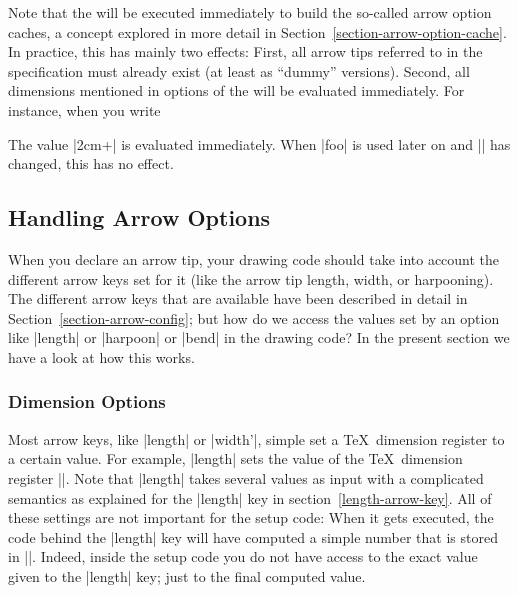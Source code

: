 \begin{command}{\pgfdeclarearrow{}}
\begin{itemize}
            Note that the  will be executed
            immediately to build the so-called arrow option caches, a concept
            explored in more detail in
            Section~\ref{section-arrow-option-cache}. In practice, this has
            mainly two effects: First, all arrow tips referred to in the
            specification must already exist (at least as ``dummy'' versions).
            Second, all dimensions mentioned in options of the  will be evaluated immediately. For instance, when
            you write
\begin{codeexample}
\end{codeexample}
            The value |2cm+\mydimen| is evaluated immediately. When |foo| is
            used later on and |\mydimen| has changed, this has no effect.
    \end{itemize}
\end{command}


\subsection{Handling Arrow Options}
\label{section-arrow-options}

When you declare an arrow tip, your drawing code should take into account the
different arrow keys set for it (like the arrow tip length, width, or
harpooning). The different arrow keys that are available have been described in
detail in Section~\ref{section-arrow-config}; but how do we access the values
set by an option like |length| or |harpoon| or |bend| in the drawing code? In
the present section we have a look at how this works.


\subsubsection{Dimension Options}

Most arrow keys, like |length| or |width'|, simple set a \TeX\ dimension
register to a certain value. For example, |length| sets the value of the \TeX\
dimension register |\pgfarrowlength|. Note that |length| takes several values
as input with a complicated semantics as explained for the |length| key in
section~\ref{length-arrow-key}. All of these settings are not important for
the setup code: When it gets executed, the code behind the |length| key will
have computed a simple number that is stored in |\pgfarrowlength|. Indeed,
inside the setup code you do not have access to the exact value given to the
|length| key; just to the final computed value.

